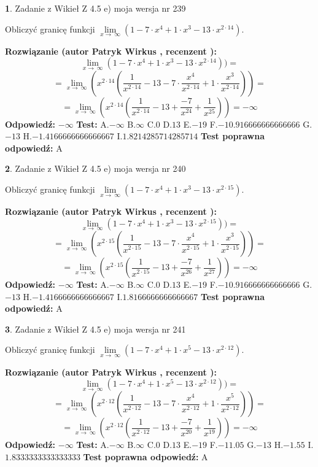 \documentclass[12pt, a4paper]{article}
\theoremstyle{definition} %
\newtheorem{zad}{}
\newcommand{\zadStart}[1]{\begin{zad}#1\newline}
\newcommand{\zadStop}{\end{zad}}
\newcommand{\rozwStart}[2]{\noindent \textbf{Rozwiązanie (autor #1 , recenzent #2): }\newline}
\newcommand{\rozwStop}{\newline}
\newcommand{\odpStart}{\noindent \textbf{Odpowiedź:}\newline}
\newcommand{\odpStop}{\newline}
\newcommand{\testStart}{\noindent \textbf{Test:}\newline}
\newcommand{\testStop}{\newline}
\newcommand{\kluczStart}{\noindent \textbf{Test poprawna odpowiedź:}\newline}
\newcommand{\kluczStop}{\newline}
\begin{document}
\zadStart{Zadanie z Wikieł Z 4.5 e) moja wersja nr 239}


Obliczyć granicę funkcji  $\lim\limits_{x\to\ \infty}(1 - 7 \cdot x^{4}+1 \cdot x^{3}- 13 \cdot x^{2\cdot14})$.
\zadStop
\rozwStart{Patryk Wirkus}{}
$$\lim\limits_{x\to\ \infty}(1 - 7 \cdot x^{4}+1 \cdot x^{3}- 13 \cdot x^{2\cdot14}))=$$
$$=\lim\limits_{x\to\ \infty}(x^{2\cdot14}(\frac{1}{x^{2\cdot14}}-13 -7 \cdot \frac{x^{4}}{x^{2\cdot14}}+1 \cdot \frac{x^{3}}{x^{2\cdot14}}))=$$
$$=\lim\limits_{x\to\ \infty}(x^{2\cdot14}(\frac{1}{x^{2\cdot14}}-13 + \frac{-7}{x^{24}}+ \frac{1}{x^{25}}))=-\infty$$
\rozwStop
\odpStart
$-\infty$
\odpStop
\testStart
A.$-\infty$ B.$\infty$ C.$0$ D.$13$ E.$-19$
F.$-10.916666666666666$ G.$-13$
H.$-1.4166666666666667$
I.$1.8214285714285714$
\testStop
\kluczStart
A
\kluczStop



\zadStart{Zadanie z Wikieł Z 4.5 e) moja wersja nr 240}


Obliczyć granicę funkcji  $\lim\limits_{x\to\ \infty}(1 - 7 \cdot x^{4}+1 \cdot x^{3}- 13 \cdot x^{2\cdot15})$.
\zadStop
\rozwStart{Patryk Wirkus}{}
$$\lim\limits_{x\to\ \infty}(1 - 7 \cdot x^{4}+1 \cdot x^{3}- 13 \cdot x^{2\cdot15}))=$$
$$=\lim\limits_{x\to\ \infty}(x^{2\cdot15}(\frac{1}{x^{2\cdot15}}-13 -7 \cdot \frac{x^{4}}{x^{2\cdot15}}+1 \cdot \frac{x^{3}}{x^{2\cdot15}}))=$$
$$=\lim\limits_{x\to\ \infty}(x^{2\cdot15}(\frac{1}{x^{2\cdot15}}-13 + \frac{-7}{x^{26}}+ \frac{1}{x^{27}}))=-\infty$$
\rozwStop
\odpStart
$-\infty$
\odpStop
\testStart
A.$-\infty$ B.$\infty$ C.$0$ D.$13$ E.$-19$
F.$-10.916666666666666$ G.$-13$
H.$-1.4166666666666667$
I.$1.8166666666666667$
\testStop
\kluczStart
A
\kluczStop



\zadStart{Zadanie z Wikieł Z 4.5 e) moja wersja nr 241}


Obliczyć granicę funkcji  $\lim\limits_{x\to\ \infty}(1 - 7 \cdot x^{4}+1 \cdot x^{5}- 13 \cdot x^{2\cdot12})$.
\zadStop
\rozwStart{Patryk Wirkus}{}
$$\lim\limits_{x\to\ \infty}(1 - 7 \cdot x^{4}+1 \cdot x^{5}- 13 \cdot x^{2\cdot12}))=$$
$$=\lim\limits_{x\to\ \infty}(x^{2\cdot12}(\frac{1}{x^{2\cdot12}}-13 -7 \cdot \frac{x^{4}}{x^{2\cdot12}}+1 \cdot \frac{x^{5}}{x^{2\cdot12}}))=$$
$$=\lim\limits_{x\to\ \infty}(x^{2\cdot12}(\frac{1}{x^{2\cdot12}}-13 + \frac{-7}{x^{20}}+ \frac{1}{x^{19}}))=-\infty$$
\rozwStop
\odpStart
$-\infty$
\odpStop
\testStart
A.$-\infty$ B.$\infty$ C.$0$ D.$13$ E.$-19$
F.$-11.05$ G.$-13$
H.$-1.55$
I.$1.8333333333333333$
\testStop
\kluczStart
A
\kluczStop
\end{document}
